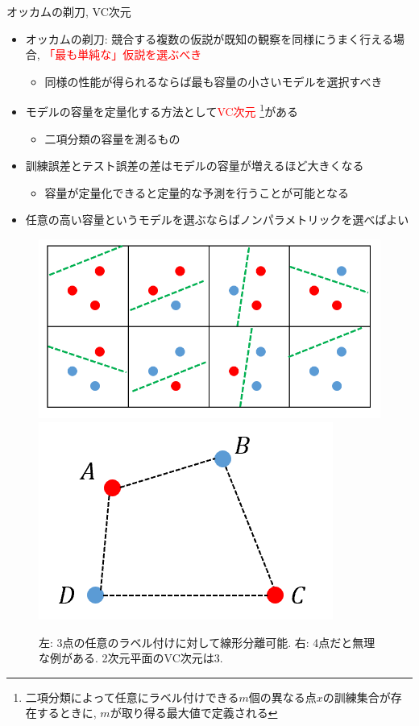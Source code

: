 \documentclass[dvipdfmx, 10pt]{beamer}
\newcommand{\red}[1]{\textcolor{red}{#1}}
\newcommand{\blue}[1]{\textcolor{blue!80!black}{#1}}
\begin{document}

\begin{frame}{オッカムの剃刀, VC次元}
  \begin{itemize}
    \item \blue{オッカムの剃刀}: 競合する複数の仮説が既知の観察を同様にうまく行える場合, \red{「最も単純な」仮説を選ぶべき}
    \begin{itemize}
      \item 同様の性能が得られるならば最も容量の小さいモデルを選択すべき
    \end{itemize}
    \item モデルの容量を定量化する方法として\textcolor{red}{VC次元}
	\footnote{二項分類によって任意にラベル付けできる$m$個の異なる点$x$の訓練集合が存在するときに, $m$が取り得る最大値で定義される}がある
    \begin{itemize}
      \item 二項分類の容量を測るもの
    \end{itemize}
    \item 訓練誤差とテスト誤差の差はモデルの容量が増えるほど大きくなる
    \begin{itemize}
      \item 容量が定量化できると定量的な予測を行うことが可能となる
    \end{itemize}
    \item 任意の高い容量というモデルを選ぶならばノンパラメトリックを選べばよい
  \end{itemize}
  \begin{figure}
	\includegraphics[height=0.2\textheight]{./images/vc3.png}
	\includegraphics[height=0.2\textheight]{./images/vc4.png}
	\caption{左: 3点の任意のラベル付けに対して線形分離可能. 右: 4点だと無理な例がある. 
	2次元平面のVC次元は3. 
	}
  \end{figure}
\end{frame}
\end{document}
